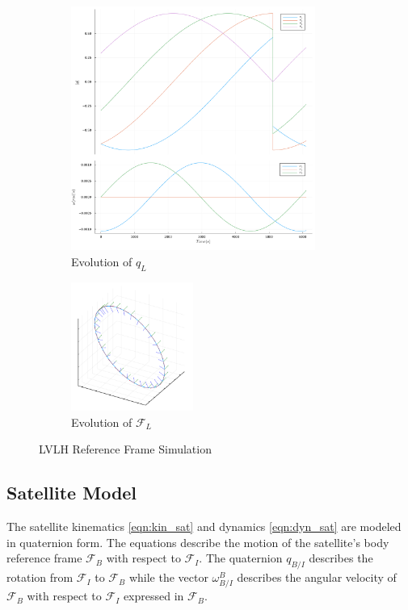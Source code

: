 \documentclass{article}
\begin{document}
\begin{figure}[H]
\centering
	\begin{subfigure}[b]{0.6\textwidth}
		\centering
		\includegraphics[width=8cm]{images/lvlh_attitude.png}
		\caption{Evolution of $q_{L}$}
		\label{fig:quat_lvlh}
	\end{subfigure}
	\begin{subfigure}[b]{0.3\textwidth}
		\centering
		\includegraphics[width=4cm]{images/lvlh_orbit_0s_to_6100s.png}
		\caption{Evolution of $\mathcal{F}_{L}$}
		\label{fig:orbit_lvlh}
	\end{subfigure}
	\caption{LVLH Reference Frame Simulation}
\end{figure}

\subsection{Satellite Model}

The satellite kinematics \ref{eqn:kin_sat} and dynamics \ref{eqn:dyn_sat} are modeled in quaternion form. The equations describe the motion of the satellite's body reference frame $\mathcal{F}_B$ with respect to $\mathcal{F}_I$. The quaternion $q_{B/I}$ describes the rotation from $\mathcal{F}_I$ to $\mathcal{F}_B$ while the vector $\omega_{B/I}^B$ describes the angular velocity of $\mathcal{F}_B$ with respect to $\mathcal{F}_I$ expressed in $\mathcal{F}_B$. 
\end{document}
